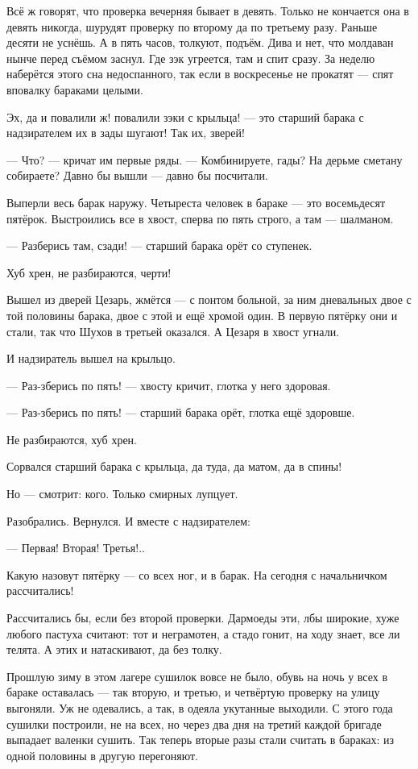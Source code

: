 Всё ж говорят, что проверка вечерняя бывает в девять. Только не кончается она в девять 
никогда, шурудят проверку по второму да по третьему разу. Раньше десяти не уснёшь. А в пять 
часов, толкуют, подъём. Дива и нет, что молдаван нынче перед съёмом заснул. Где зэк угреется, 
там и спит сразу. За неделю наберётся этого сна недоспанного, так если в воскресенье не 
прокатят --- спят вповалку бараками целыми.

Эх, да и повалили ж! повалили зэки с крыльца! --- это старший барака с надзирателем их в зады 
шугают! Так их, зверей!

--- Что? --- кричат им первые ряды. --- Комбинируете, гады? На дерьме сметану собираете? Давно бы 
вышли --- давно бы посчитали.

Выперли весь барак наружу. Четыреста человек в бараке --- это восемьдесят пятёрок. 
Выстроились все в хвост, сперва по пять строго, а там --- шалманом.

--- Разберись там, сзади! --- старший барака орёт со ступенек.

Хуб хрен, не разбираются, черти!

Вышел из дверей Цезарь, жмётся --- с понтом больной, за ним дневальных двое с той половины 
барака, двое с этой и ещё хромой один. В первую пятёрку они и стали, так что Шухов в третьей 
оказался. А Цезаря в хвост угнали.

И надзиратель вышел на крыльцо.

--- Раз-зберись по пять! --- хвосту кричит, глотка у него здоровая.

--- Раз-зберись по пять! --- старший барака орёт, глотка ещё здоровше.

Не разбираются, хуб хрен.

Сорвался старший барака с крыльца, да туда, да матом, да в спины!

Но --- смотрит: кого. Только смирных лупцует.

Разобрались. Вернулся. И вместе с надзирателем:

--- Первая! Вторая! Третья!..

Какую назовут пятёрку --- со всех ног, и в барак. На сегодня с начальничком рассчитались!

Рассчитались бы, если без второй проверки. Дармоеды эти, лбы широкие, хуже любого пастуха 
считают: тот и неграмотен, а стадо гонит, на ходу знает, все ли телята. А этих и натаскивают, да 
без толку.

Прошлую зиму в этом лагере сушилок вовсе не было, обувь на ночь у всех в бараке оставалась --- 
так вторую, и третью, и четвёртую проверку на улицу выгоняли. Уж не одевались, а так, в одеяла 
укутанные выходили. С этого года сушилки построили, не на всех, но через два дня на третий 
каждой бригаде выпадает валенки сушить. Так теперь вторые разы стали считать в бараках: из 
одной половины в другую перегоняют.

